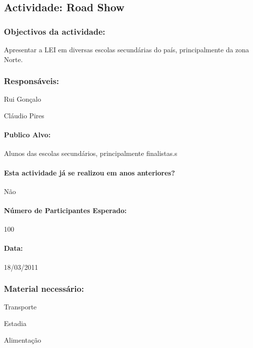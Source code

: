 \subsection{Actividade: Road Show} %

\subsubsection*{Objectivos da actividade:}
Apresentar a LEI em diversas escolas secundárias do país, principalmente da zona Norte.

\subsubsection*{Responsáveis:}
\begin{itemizedash}
	\item{Rui Gonçalo}
	\item{Cláudio Pires}
\end{itemizedash}

\paragraph{Publico Alvo: }
Alunos das escolas secundários, principalmente finalistas.s

\paragraph{Esta actividade já se realizou em anos anteriores?}
Não

\paragraph{Número de Participantes Esperado:}
100

\paragraph{Data:} 18/03/2011

\subsubsection*{Material necessário:}
\begin{itemizedash}
	\item{Transporte}
	\item{Estadia}
	\item{Alimentação}
\end{itemizedash}

